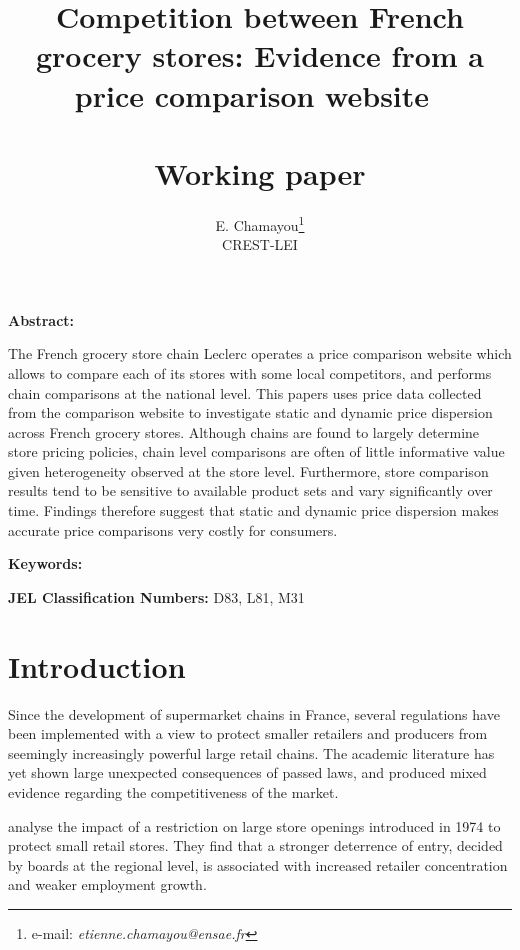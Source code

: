 \documentclass[english]{article}
\begin{document}
\title{Competition between French grocery stores: Evidence from a price comparison website\ \\ \ \\Working paper}
\author{E. Chamayou\thanks{e-mail:
\textit{etienne.chamayou@ensae.fr}} \\ CREST-LEI}
\maketitle

\sloppy%

\onehalfspacing

\textbf{Abstract:}

The French grocery store chain Leclerc operates a price comparison website which allows to compare each of its stores with some local competitors, and performs chain comparisons at the national level. This papers uses price data collected from the comparison website to investigate static and dynamic price dispersion across French grocery stores. Although chains are found to largely determine store pricing policies, chain level comparisons are often of little informative value given heterogeneity observed at the store level. Furthermore, store comparison results tend to be sensitive to available product sets and vary significantly over time. Findings therefore suggest that static and dynamic price dispersion makes accurate price comparisons very costly for consumers.

\strut

\textbf{Keywords:}

\strut

\textbf{JEL Classification Numbers:} D83, L81, M31

\pagebreak%

\section{Introduction}

Since the development of supermarket chains in France, several regulations have been implemented with a view to protect smaller retailers and producers from seemingly increasingly powerful large retail chains. The academic literature has yet shown large unexpected consequences of passed laws, and produced mixed evidence regarding the competitiveness of the market.

\cite{BER02} analyse the impact of a restriction on large store openings introduced in 1974 to protect small retail stores. They find that a stronger deterrence of entry, decided by boards at the regional level, is associated with increased retailer concentration and weaker employment growth.
\end{document}
